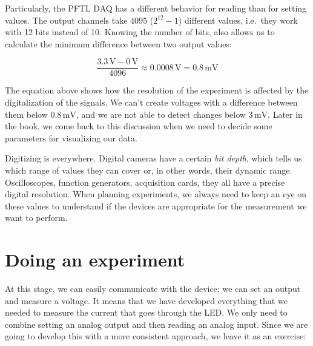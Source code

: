 Particularly, the {PFTL DAQ} has a different behavior for reading than for setting values. The output channels take $4095$ ($2^{12}-1$) different values, i.e.\ they work with 12 bits instead of 10. Knowing the number of bits, also allows us to calculate the minimum difference between two output values:

\begin{equation}
 \frac{3.3\,\textrm{V} - 0\,\textrm{V}}{4096} \approx 0.0008\,\textrm{V} = 0.8\,\textrm{mV}
\end{equation}

The equation above shows how the resolution of the experiment is affected by the digitalization of the signals. We can't create voltages with a difference between them below $0.8\,\textrm{mV}$, and we are not able to detect changes below $3\,\textrm{mV}$. Later in the book, we come back to this discussion when we need to decide some parameters for visualizing our data.

Digitizing is everywhere. Digital cameras have a certain \emph{bit depth}, which tells us which range of values they can cover or, in other words, their dynamic range. Oscilloscopes, function generators, acquisition cards, they all have a precise digital resolution. When planning experiments, we always need to keep an eye on these values to understand if the devices are appropriate for the measurement we want to perform.


\section{Doing an experiment}\label{sec:doing-an-experiment}
At this stage, we can easily communicate with the device; we can set an output and measure a voltage. It means that we have developed everything that we needed to measure the current that goes through the LED. We only need to combine setting an analog output and then reading an analog input. Since we are going to develop this with a more consistent approach, we leave it as an exercise:


